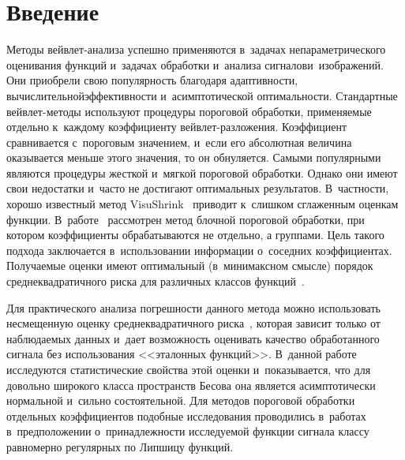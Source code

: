 



\thispagestyle{headings}

\begin{multicols}{2}

\label{st\stat}

\section{Введение}

Методы вейвлет-анализа успешно применяются в~задачах непараметрического оценивания функций 
и~задачах обработки и~анализа сигналов\linebreak и~изоб\-ра\-же\-ний. Они приобрели свою популярность благодаря 
адаптивности, вычислительной\linebreak эффективности и~асимптотической оп\-ти\-маль\-ности. Стандартные 
вейв\-лет-ме\-то\-ды используют процедуры пороговой обработки, применяемые отдель\-но к~каж\-до\-му коэффициенту 
вейв\-лет-раз\-ло\-же\-ния. Коэффициент сравнивается с~пороговым значением, и~если его абсолютная 
величина оказывается меньше этого значения, то он обнуляется. Самыми популярными являются 
процедуры жесткой и~мягкой пороговой обработки. Однако они имеют свои недостатки и~часто 
не достигают оп\-тимальных результатов. В~част\-ности, хорошо известный метод VisuShrink~\cite{DonJ94} 
приводит к~слишком сглаженным оценкам функции. В~работе~\cite{HKP99} рассмотрен метод блочной пороговой 
обработки, при котором коэффициенты обрабатываются не отдельно, а группами. Цель 
такого подхода заключается в~использовании информации о~соседних коэффициентах. 
Получаемые оценки имеют оптимальный (в~минимаксном смысле) порядок среднеквадратичного
 риска для различных классов функций~\cite{Cai99}.

Для практического анализа погрешности данного метода можно использовать 
несмещенную оценку среднеквадратичного риска~\cite{St81}, которая зависит только от наблюдаемых 
данных и~дает возможность оценивать качество обработанного сигнала без использования <<эталонных функций>>. 
В~данной работе исследуются статистические свойства этой оценки и~показывается, что 
для довольно широкого класса пространств Бесова она является асимптотически нормальной и~сильно 
состоятельной. Для методов пороговой обработки отдельных коэффициентов подобные исследования 
проводились в~работах~\cite{SH12, SH16-1, SH16-2, PSH19} в~предположении о~принадлежности
 исследуемой функции сигнала классу равномерно регулярных по Липшицу функций.


\end{multicols}
